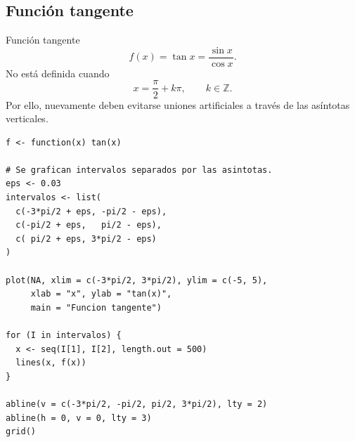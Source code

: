 \documentclass[aspectratio=169,10pt]{beamer}
\begin{document}
\subsection*{Función tangente}
\begin{frame}{Función tangente}
\[
f(x)=\tan x=\frac{\sin x}{\cos x}.
\]
No está definida cuando
\[
x=\frac{\pi}{2}+k\pi,\qquad k\in\mathbb Z.
\]
Por ello, nuevamente deben evitarse uniones artificiales a través de las
asíntotas verticales.

\begin{center}
\end{center}

\begin{verbatim}
f <- function(x) tan(x)

# Se grafican intervalos separados por las asintotas.
eps <- 0.03
intervalos <- list(
  c(-3*pi/2 + eps, -pi/2 - eps),
  c(-pi/2 + eps,   pi/2 - eps),
  c( pi/2 + eps, 3*pi/2 - eps)
)

plot(NA, xlim = c(-3*pi/2, 3*pi/2), ylim = c(-5, 5),
     xlab = "x", ylab = "tan(x)",
     main = "Funcion tangente")

for (I in intervalos) {
  x <- seq(I[1], I[2], length.out = 500)
  lines(x, f(x))
}

abline(v = c(-3*pi/2, -pi/2, pi/2, 3*pi/2), lty = 2)
abline(h = 0, v = 0, lty = 3)
grid()
\end{verbatim}

\end{frame}
\end{document}

